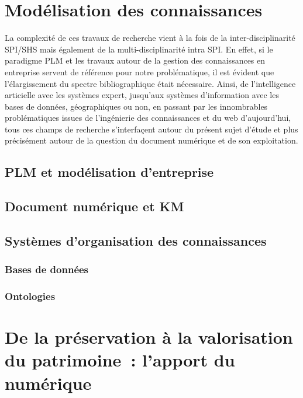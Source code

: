 \documentclass[a4paper,11pt,french]{article}
\begin{document}
\section{Modélisation des connaissances}

La complexité de ces travaux de recherche vient à la fois de la inter-disciplinarité SPI/SHS mais également de la multi-disciplinarité intra SPI. En effet, si le paradigme PLM et les travaux autour de la gestion des connaissances en entreprise servent de référence pour notre problématique, il est évident que l'élargissement du spectre bibliographique était nécessaire. Ainsi, de l'intelligence articielle avec les systèmes expert, jusqu'aux systèmes d'information avec les bases de données, géographiques ou non, en passant par les innombrables problématiques issues de l'ingénierie des connaissances et du web d'aujourd'hui, tous ces champs de recherche s'interfaçent autour du présent sujet d'étude et plus précisément autour de la question du document numérique et de son exploitation.

\subsection{PLM et modélisation d'entreprise}

\subsection{Document numérique et KM}

\subsection{Systèmes d'organisation des connaissances}

\subsubsection{Bases de données}

\subsubsection{Ontologies}

\section{De la préservation à la valorisation du patrimoine~: l'apport du numérique}
\end{document}
